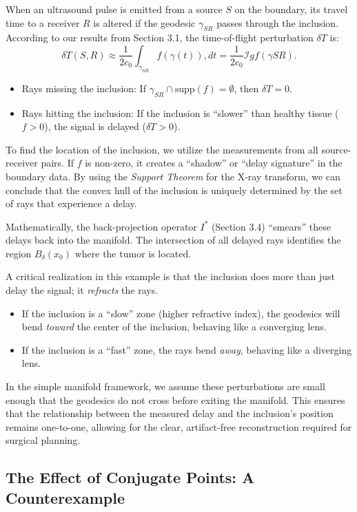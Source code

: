 When an ultrasound pulse is emitted from a source $S$ on the boundary, its travel time to a receiver $R$ is altered if the geodesic $\gamma_{SR}$ passes through the inclusion. According to our results from Section 3.1, the time-of-flight perturbation $\delta T$ is:
\[%
  \delta T(S, R) \approx \frac{1}{2c_0} \int_{\gamma_{SR}} f(\gamma(t)) , dt = \frac{1}{2c_0} \mathcal{I}g f(\gamma{SR})
.\]%

\begin{itemize}
  \item Rays missing the inclusion: If $\gamma_{SR} \cap \text{supp}(f) = \emptyset$, then $\delta T = 0$.
  \item Rays hitting the inclusion: If the inclusion is ``slower'' than healthy tissue ($f > 0$), the signal is delayed ($\delta T > 0$).
\end{itemize}

To find the location of the inclusion, we utilize the measurements from all source-receiver pairs. If $f$ is non-zero, it creates a ``shadow'' or ``delay signature'' in the boundary data. By using the \emph{Support Theorem} for the X-ray transform, we can conclude that the convex hull of the inclusion is uniquely determined by the set of rays that experience a delay.

Mathematically, the back-projection operator $I^*$ (Section 3.4) ``smears'' these delays back into the manifold. The intersection of all delayed rays identifies the region $B_\delta(x_0)$ where the tumor is located.

A critical realization in this example is that the inclusion does more than just delay the signal; it \emph{refracts} the rays.
\begin{itemize}
  \item If the inclusion is a ``slow'' zone (higher refractive index), the geodesics will bend \emph{toward} the center of the inclusion, behaving like a converging lens.
  \item If the inclusion is a ``fast'' zone, the rays bend \emph{away}, behaving like a diverging lens.
\end{itemize}

In the simple manifold framework, we assume these perturbations are small enough that the geodesics do not cross before exiting the manifold. This ensures that the relationship between the measured delay and the inclusion's position remains one-to-one, allowing for the clear, artifact-free reconstruction required for surgical planning.

\subsection{The Effect of Conjugate Points: A Counterexample}

